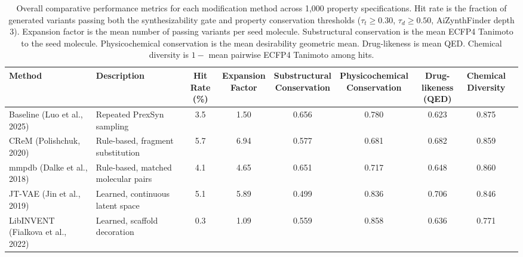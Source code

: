 
\begin{table}[ht]
\centering
\caption{Overall comparative performance metrics for each modification method
across 1,000 property specifications. Hit rate is the fraction of generated
variants passing both the synthesizability gate and property conservation
thresholds ($\tau_t \geq 0.30$, $\tau_d \geq 0.50$, AiZynthFinder depth 3).
Expansion factor is the mean number of passing variants per seed molecule.
Substructural conservation is the mean ECFP4 Tanimoto to the seed molecule.
Physicochemical conservation is the mean desirability geometric mean.
Drug-likeness is mean QED. Chemical diversity is $1 - $ mean pairwise
ECFP4 Tanimoto among hits.}
\label{tab:overall}
\begin{tabular}{llccccccc}
\toprule
Method & Description
  & \makecell{Hit Rate \\ (\%)}
  & \makecell{Expansion \\ Factor}
  & \makecell{Substructural \\ Conservation}
  & \makecell{Physicochemical \\ Conservation}
  & \makecell{Drug-likeness \\ (QED)}
  & \makecell{Chemical \\ Diversity} \\
\midrule
Baseline (Luo et al., 2025)        & Repeated PrexSyn sampling          & 3.5  & 1.50  & 0.656 & 0.780 & 0.623 & 0.875 \\
CReM (Polishchuk, 2020)            & Rule-based, fragment substitution   & 5.7  & 6.94  & 0.577 & 0.681 & 0.682 & 0.859 \\
mmpdb (Dalke et al., 2018)         & Rule-based, matched molecular pairs & 4.1  & 4.65  & 0.651 & 0.717 & 0.648 & 0.860 \\
JT-VAE (Jin et al., 2019)          & Learned, continuous latent space    & 5.1  & 5.89  & 0.499 & 0.836 & 0.706 & 0.846 \\
LibINVENT (Fialkova et al., 2022)  & Learned, scaffold decoration        & 0.3  & 1.09  & 0.559 & 0.858 & 0.636 & 0.771 \\
\bottomrule
\end{tabular}
\end{table}

